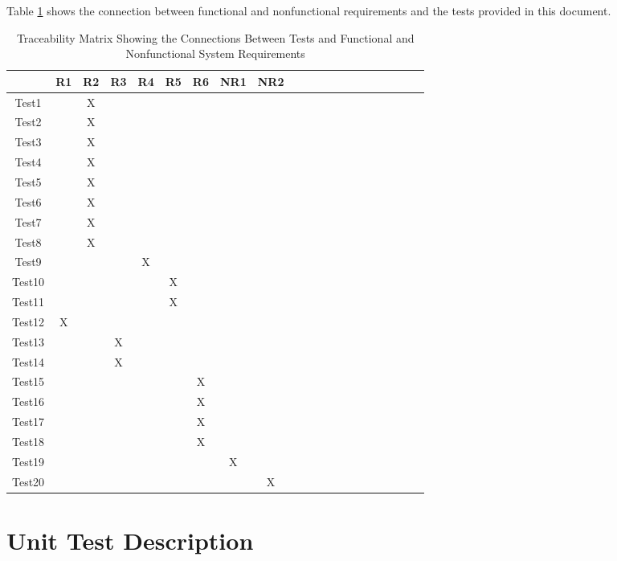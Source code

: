 \documentclass[12pt, titlepage]{article}
\begin{document}
Table \ref{Table:A_trace} shows the connection between functional and nonfunctional requirements and the tests provided in this document. 

\begin{table}[h!]
	\centering
	\begin{tabular}{|c|c|c|c|c|c|c|c|c|c|c|c|c|c|c|c|c|c|c|c|c|}
		\hline        
		& R1 & R2 & R3 & R4 & R5 & R6 & NR1 & NR2 \\
		\hline
		Test1        & &X & & & & & &   \\ \hline
		Test2        & &X & & & & & &   \\ \hline
		Test3        & &X & & & & & &  \\ \hline
		Test4        & &X & & & & & & \\ \hline
		Test5        & &X & & & & & &   \\ \hline
		Test6        & &X & & & & & &  \\ \hline
		Test7        & &X & & & & & &  \\ \hline
		Test8        & &X & & & & & &  \\ \hline
		Test9        & & & &X & & & &  \\ \hline
		Test10       & & & & &X & & &  \\ \hline
		Test11       & & & & & X& & &  \\ \hline
		Test12       &X & & & & & & &  \\ \hline
		Test13       & & &X & & & & &  \\ \hline
		Test14       & & &X & & & & &  \\ \hline
		Test15       & & & & & &X & &  \\ \hline
		Test16       & & & & & &X & &  \\ \hline
		Test17       & & & & & &X & &  \\ \hline
		Test18       & & & & & &X & &  \\ \hline
		Test19       & & & & & & &X &  \\ \hline
		Test20       & & & & & & & &X  \\ \hline
	\end{tabular}
\caption{Traceability Matrix Showing the Connections Between Tests and Functional and Nonfunctional System Requirements}
\label{Table:A_trace}
\end{table}

\section{Unit Test Description}
\end{document}
